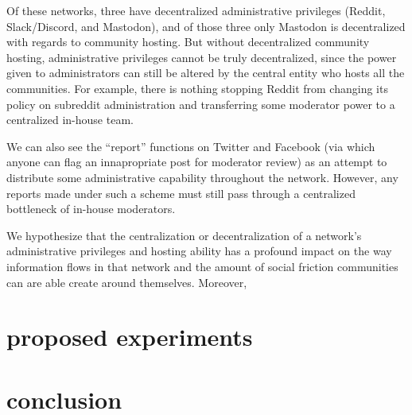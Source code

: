 \documentclass[sigconf,authordraft]{acmart}
\begin{document}
Of these networks, three have decentralized administrative privileges (Reddit, Slack/Discord, and Mastodon), and of those three only Mastodon is decentralized with regards to community hosting. But without decentralized community hosting, administrative privileges cannot be truly decentralized, since the power given to administrators can still be altered by the central entity who hosts all the communities. For example, there is nothing stopping Reddit from changing its policy on subreddit administration and transferring some moderator power to a centralized in-house team.

We can also see the ``report'' functions on Twitter and Facebook (via which anyone can flag an innapropriate post for moderator review) as an attempt to distribute some administrative capability throughout the network. However, any reports made under such a scheme must still pass through a centralized bottleneck of in-house moderators. 

We hypothesize that the centralization or decentralization of a network's administrative privileges and hosting ability has a profound impact on the way information flows in that network and the amount of social friction communities can are able create around themselves. Moreover, 

\section{proposed experiments}

\section{conclusion}





\end{document}
